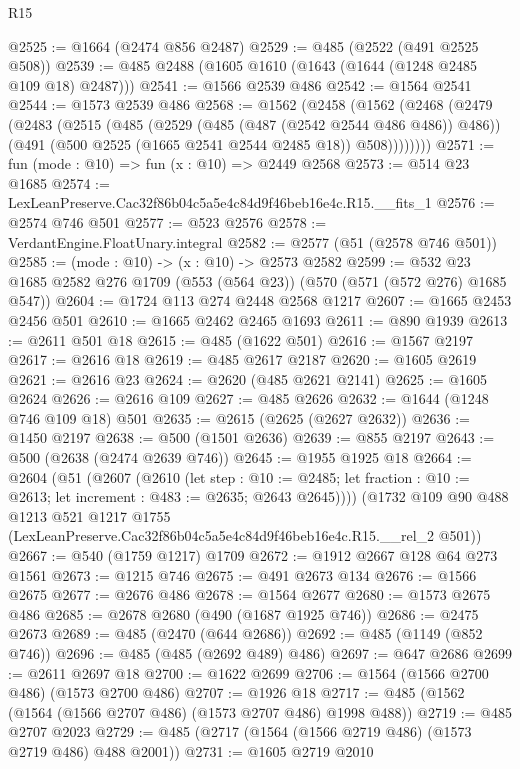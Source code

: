 \begin{lexlean}{R15}
\begin{coremodule}
@2525 := @1664 (@2474 @856 @2487)
@2529 := @485 (@2522 (@491 @2525 @508))
@2539 := @485 @2488 (@1605 @1610 (@1643 (@1644 (@1248 @2485 @109 @18) @2487)))
@2541 := @1566 @2539 @486
@2542 := @1564 @2541
@2544 := @1573 @2539 @486
@2568 := @1562
    (@2458
      (@1562
        (@2468
          (@2479
            (@2483
              (@2515
                (@485
                  (@2529 (@485 (@487 (@2542 @2544 @486 @486)) @486))
                  (@491 (@500 @2525 (@1665 @2541 @2544 @2485 @18)) @508))))))))
@2571 := fun (mode : @10) => fun (x : @10) => @2449 @2568
@2573 := @514 @23 @1685
@2574 := LexLeanPreserve.Cac32f86b04c5a5e4c84d9f46beb16e4c.R15.__fits_1
@2576 := @2574 @746 @501
@2577 := @523 @2576
@2578 := VerdantEngine.FloatUnary.integral
@2582 := @2577 (@51 (@2578 @746 @501))
@2585 := (mode : @10) -> (x : @10) -> @2573 @2582
@2599 := @532 @23 @1685 @2582 @276 @1709 (@553 (@564 @23)) (@570 (@571 (@572 @276) @1685 @547))
@2604 := @1724 @113 @274 @2448 @2568 @1217
@2607 := @1665 @2453 @2456 @501
@2610 := @1665 @2462 @2465 @1693
@2611 := @890 @1939
@2613 := @2611 @501 @18
@2615 := @485 (@1622 @501)
@2616 := @1567 @2197
@2617 := @2616 @18
@2619 := @485 @2617 @2187
@2620 := @1605 @2619
@2621 := @2616 @23
@2624 := @2620 (@485 @2621 @2141)
@2625 := @1605 @2624
@2626 := @2616 @109
@2627 := @485 @2626
@2632 := @1644 (@1248 @746 @109 @18) @501
@2635 := @2615 (@2625 (@2627 @2632))
@2636 := @1450 @2197
@2638 := @500 (@1501 @2636)
@2639 := @855 @2197
@2643 := @500 (@2638 (@2474 @2639 @746))
@2645 := @1955 @1925 @18
@2664 := @2604
    (@51
      (@2607
        (@2610
          (let step : @10 := @2485;
          let fraction : @10 := @2613; let increment : @483 := @2635; @2643 @2645))))
    (@1732
      @109
      @90
      @488
      @1213
      @521
      @1217
      @1755
      (LexLeanPreserve.Cac32f86b04c5a5e4c84d9f46beb16e4c.R15.__rel_2 @501))
@2667 := @540 (@1759 @1217) @1709
@2672 := @1912 @2667 @128 @64 @273 @1561
@2673 := @1215 @746
@2675 := @491 @2673 @134
@2676 := @1566 @2675
@2677 := @2676 @486
@2678 := @1564 @2677
@2680 := @1573 @2675 @486
@2685 := @2678 @2680 (@490 (@1687 @1925 @746))
@2686 := @2475 @2673
@2689 := @485 (@2470 (@644 @2686))
@2692 := @485 (@1149 (@852 @746))
@2696 := @485 (@485 (@2692 @489) @486)
@2697 := @647 @2686
@2699 := @2611 @2697 @18
@2700 := @1622 @2699
@2706 := @1564 (@1566 @2700 @486) (@1573 @2700 @486)
@2707 := @1926 @18
@2717 := @485 (@1562 (@1564 (@1566 @2707 @486) (@1573 @2707 @486) @1998 @488))
@2719 := @485 @2707 @2023
@2729 := @485 (@2717 (@1564 (@1566 @2719 @486) (@1573 @2719 @486) @488 @2001))
@2731 := @1605 @2719 @2010

\end{coremodule}
\end{lexlean}
